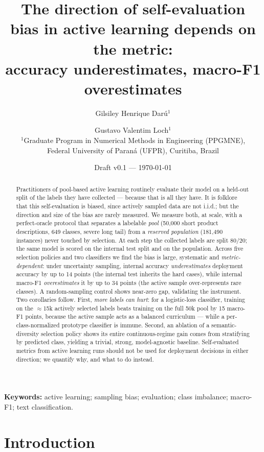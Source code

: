 \documentclass[11pt]{article}
\title{The direction of self-evaluation bias in active learning depends on
the metric:\\ accuracy underestimates, macro-F1 overestimates}
\author{Gilsiley Henrique Darú$^{1}$ \and Gustavo Valentim Loch$^{1}$\\[2pt]
\normalsize $^{1}$Graduate Program in Numerical Methods in Engineering (PPGMNE),\\
\normalsize Federal University of Paraná (UFPR), Curitiba, Brazil}
\date{Draft v0.1 --- \today}
\begin{document}
\maketitle

\begin{abstract}
Practitioners of pool-based active learning routinely evaluate their model
on a held-out split of the labels they have collected --- because that is
all they have. It is folklore that this self-evaluation is biased, since
actively sampled data are not i.i.d.; but the direction and size of the
bias are rarely measured. We measure both, at scale, with a perfect-oracle
protocol that separates a labelable \emph{pool} (50{,}000 short product
descriptions, 649 classes, severe long tail) from a \emph{reserved
population} (181{,}490 instances) never touched by selection. At each step
the collected labels are split 80/20; the same model is scored on the
internal test split and on the population. Across five selection policies
and two classifiers we find the bias is large, systematic and
\emph{metric-dependent}: under uncertainty sampling, internal accuracy
\emph{underestimates} deployment accuracy by up to 14 points (the internal
test inherits the hard cases), while internal macro-F1 \emph{overestimates}
it by up to 34 points (the active sample over-represents rare classes). A
random-sampling control shows near-zero gap, validating the instrument.
Two corollaries follow. First, \emph{more labels can hurt}: for a
logistic-loss classifier, training on the $\approx$15k actively selected
labels beats training on the full 50k pool by 15 macro-F1 points, because
the active sample acts as a balanced curriculum --- while a
per-class-normalized prototype classifier is immune. Second, an ablation
of a semantic-diversity selection policy shows its entire continuous-regime
gain comes from stratifying by predicted class, yielding a trivial,
strong, model-agnostic baseline. Self-evaluated metrics from active
learning runs should not be used for deployment decisions in either
direction; we quantify why, and what to do instead.
\end{abstract}

\noindent\textbf{Keywords:} active learning; sampling bias; evaluation;
class imbalance; macro-F1; text classification.

\section{Introduction}
\label{sec:intro}
\end{document}
